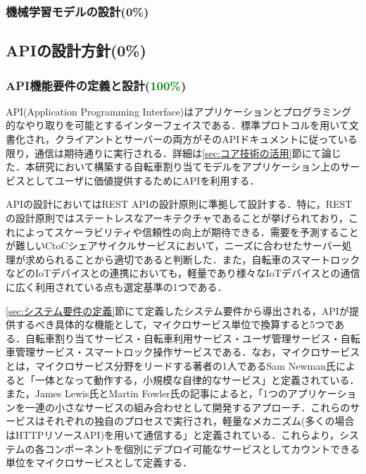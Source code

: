       \subsubsection{機械学習モデルの設計(0\%)}
        \label{sec:machine_learning_model_design}
          \par

  \subsection{APIの設計方針(0\%)}
    \label{sec:api_design_policy}
      \par
      
      \subsubsection{API機能要件の定義と設計(\textcolor{green}{100\%})}
        \label{sec:definition_of_api_function}
          \par API(Application Programming Interface)はアプリケーションとプログラミング的なやり取りを可能とするインターフェイスである．標準プロトコルを用いて文書化され，クライアントとサーバーの両方がそのAPIドキュメントに従っている限り，通信は期待通りに実行される．詳細は\ref{sec:コア技術の活用}節にて論じた．本研究において構築する自転車割り当てモデルをアプリケーション上のサービスとしてユーザに価値提供するためにAPIを利用する．
          \par APIの設計においてはREST APIの設計原則に準拠して設計する．特に，RESTの設計原則ではステートレスなアーキテクチャであることが挙げられており，これによってスケーラビリティや信頼性の向上が期待できる．需要を予測することが難しいCtoCシェアサイクルサービスにおいて，ニーズに合わせたサーバー処理が求められることから適切であると判断した．また，自転車のスマートロックなどのIoTデバイスとの連携においても，軽量であり様々なIoTデバイスとの通信に広く利用されている点も選定基準の1つである．
          \par \ref{sec:システム要件の定義}節にて定義したシステム要件から導出される，APIが提供するべき具体的な機能として，マイクロサービス単位で換算すると5つである．自転車割り当てサービス・自転車利用サービス・ユーザ管理サービス・自転車管理サービス・スマートロック操作サービスである．なお，マイクロサービスとは，マイクロサービス分野をリードする著者の1人であるSam Newman氏によると「一体となって動作する，小規模な自律的なサービス」と定義されている．また，James Lewis氏とMartin Fowler氏の記事によると，「1つのアプリケーションを一連の小さなサービスの組み合わせとして開発するアプローチ．これらのサービスはそれぞれの独自のプロセスで実行され，軽量なメカニズム(多くの場合はHTTPリソースAPI)を用いて通信する」と定義されている．これらより，システムの各コンポーネントを個別にデプロイ可能なサービスとしてカウントできる単位をマイクロサービスとして定義する．
